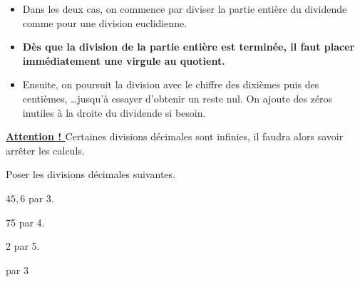 \documentclass[a4paper]{book}
\begin{document}
    \begin{methode}
        \begin{itemize}
            \item Dans les deux cas, on commence par diviser la partie entière du dividende comme pour une division euclidienne.

            \medskip

            \item \textbf{Dès que la division de la partie entière est terminée, il faut placer immédiatement une virgule au quotient.}

            \medskip

            \item Ensuite, on poursuit la division avec le chiffre des dixièmes puis des centièmes, \ldots jusqu'à essayer d'obtenir un reste nul. On ajoute des zéros \og inutiles \fg à la droite du dividende si besoin.
        \end{itemize}
    \end{methode}


    \begin{remarque}
        \textbf{\underline{Attention ! }} Certaines divisions décimales sont infinies, il faudra alors savoir arrêter les calculs.   
    \end{remarque}


\newpage


    \begin{exemple}
        Poser les divisions décimales suivantes.

        \medskip

        \begin{minipage}{0.24\linewidth}
            $45,6$ par 3.
            
            \vspace{4cm}
        \end{minipage}
        \hfill
        \vline
        \hfill
        \begin{minipage}{0.24\linewidth}
            75 par 4.
             
            \vspace{4cm}
        \end{minipage}
        \hfill
        \vline
        \hfill
        \begin{minipage}{0.24\linewidth}
            2 par 5.
            
            \vspace{4cm}
        \end{minipage}
        \hfill
        \vline
        \hfill
        \begin{minipage}{0.24\linewidth}
             par 3
            
            \vspace{4cm}
        \end{minipage}
    \end{exemple}
\end{document}
